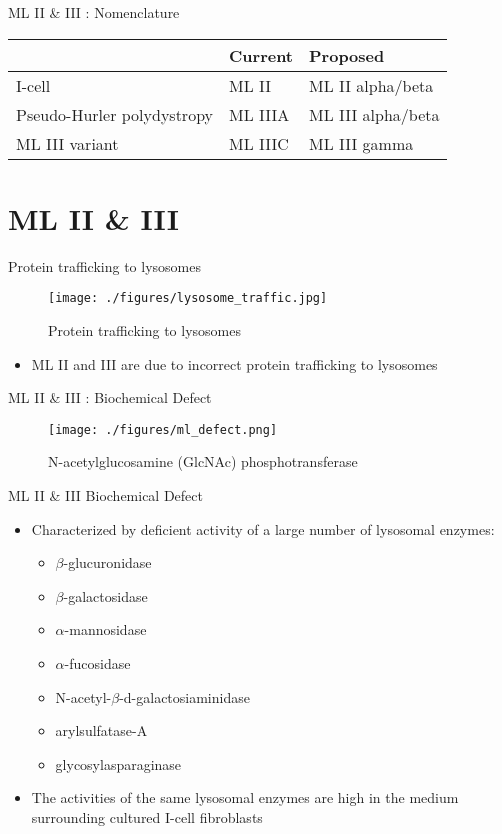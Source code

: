 \documentclass[presentation, smaller]{beamer}
\begin{document}
\begin{frame}[label={sec:orgheadline2}]{ML II \& III : Nomenclature}
\begin{center}
\begin{tabular}{lll}
 & Current & Proposed\\
\hline
I-cell & ML II & ML II alpha/beta\\
Pseudo-Hurler polydystropy & ML IIIA & ML III alpha/beta\\
ML III variant & ML IIIC & ML III gamma\\
\end{tabular}
\end{center}
\end{frame}

\section{ML II \& III}
\label{sec:orgheadline11}
\begin{frame}[label={sec:orgheadline4}]{Protein trafficking to lysosomes}
\begin{figure}[htb]
\centering
\texttt{[image: ./figures/lysosome\_traffic.jpg]}
\caption{\label{fig:traffic}
Protein trafficking to lysosomes}
\end{figure}

\begin{itemize}
\item ML II and III are due to incorrect protein trafficking to lysosomes
\end{itemize}
\end{frame}

\begin{frame}[label={sec:orgheadline5}]{ML II \& III : Biochemical Defect}
\begin{figure}[htb]
\centering
\texttt{[image: ./figures/ml\_defect.png]}
\caption{\label{fig:biochem}
N-acetylglucosamine (GlcNAc) phosphotransferase}
\end{figure}
\end{frame}

\begin{frame}[label={sec:orgheadline6}]{ML II \& III Biochemical Defect}
\begin{itemize}
\item Characterized by deficient activity of a large number of lysosomal enzymes:
\begin{itemize}
\item \(\beta\)-glucuronidase
\item \(\beta\)-galactosidase
\item \(\alpha\)-mannosidase
\item \(\alpha\)-fucosidase
\item N-acetyl-\(\beta\)-d-galactosiaminidase
\item arylsulfatase-A
\item glycosylasparaginase
\end{itemize}
\item The activities of the same lysosomal enzymes are high in the medium
surrounding cultured I-cell fibroblasts
\end{itemize}
\end{frame}
\end{document}
